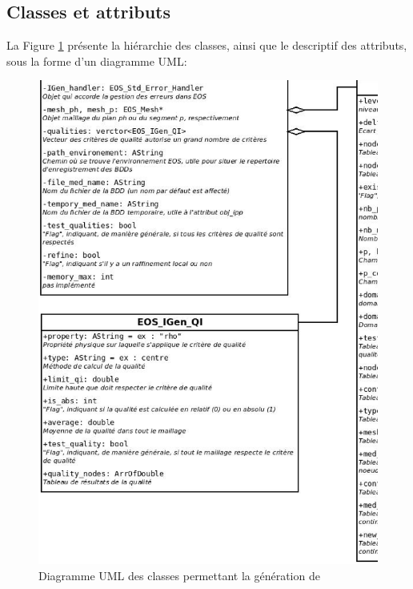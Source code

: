   \subsection{Classes et attributs}
    La Figure \ref{uml_att} présente la hiérarchie des classes, ainsi que le descriptif des attributs, sous la forme d'un diagramme UML:
    \begin{figure}[H]
      \center
      \includegraphics[width=1.0\textwidth]{Eos_IGen_att.eps}
      \caption{Diagramme UML des classes permettant la génération de \bdd}\label{uml_att}
    \end{figure}
    
    
